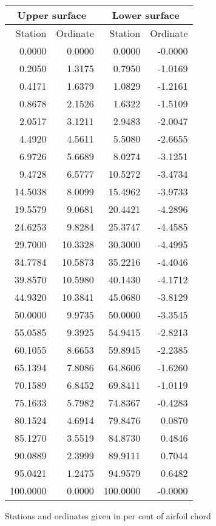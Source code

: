 \documentclass[11pt]{book}
\begin{document}
 \hspace{4mm}
 \begin{tabular}{|r|r|r|r|} \hline 
 \multicolumn{2}{|c|}{Upper surface} & \multicolumn{2}{|c|}{Lower surface} \\
 \hline
 Station & Ordinate & Station & Ordinate \\
 \hline
0.0000 & 0.0000 & 0.0000 & -0.0000 \\
0.2050 & 1.3175 & 0.7950 & -1.0169 \\
0.4171 & 1.6379 & 1.0829 & -1.2161 \\
0.8678 & 2.1526 & 1.6322 & -1.5109 \\
2.0517 & 3.1211 & 2.9483 & -2.0047 \\
4.4920 & 4.5611 & 5.5080 & -2.6655 \\
6.9726 & 5.6689 & 8.0274 & -3.1251 \\
9.4728 & 6.5777 & 10.5272 & -3.4734 \\
14.5038 & 8.0099 & 15.4962 & -3.9733 \\
19.5579 & 9.0681 & 20.4421 & -4.2896 \\
24.6253 & 9.8284 & 25.3747 & -4.4585 \\
29.7000 & 10.3328 & 30.3000 & -4.4995 \\
34.7784 & 10.5873 & 35.2216 & -4.4046 \\
39.8570 & 10.5980 & 40.1430 & -4.1712 \\
44.9320 & 10.3841 & 45.0680 & -3.8129 \\
50.0000 & 9.9735 & 50.0000 & -3.3545 \\
55.0585 & 9.3925 & 54.9415 & -2.8213 \\
60.1055 & 8.6653 & 59.8945 & -2.2385 \\
65.1394 & 7.8086 & 64.8606 & -1.6260 \\
70.1589 & 6.8452 & 69.8411 & -1.0119 \\
75.1633 & 5.7982 & 74.8367 & -0.4283 \\
80.1524 & 4.6914 & 79.8476 & 0.0870 \\
85.1270 & 3.5519 & 84.8730 & 0.4846 \\
90.0889 & 2.3999 & 89.9111 & 0.7044 \\
95.0421 & 1.2475 & 94.9579 & 0.6482 \\
100.0000 & 0.0000 & 100.0000 & -0.0000 \\
 \hline 
 \end{tabular}
 \vspace{8mm}

Stations and ordinates given in per cent of airfoil chord
\end{document}
